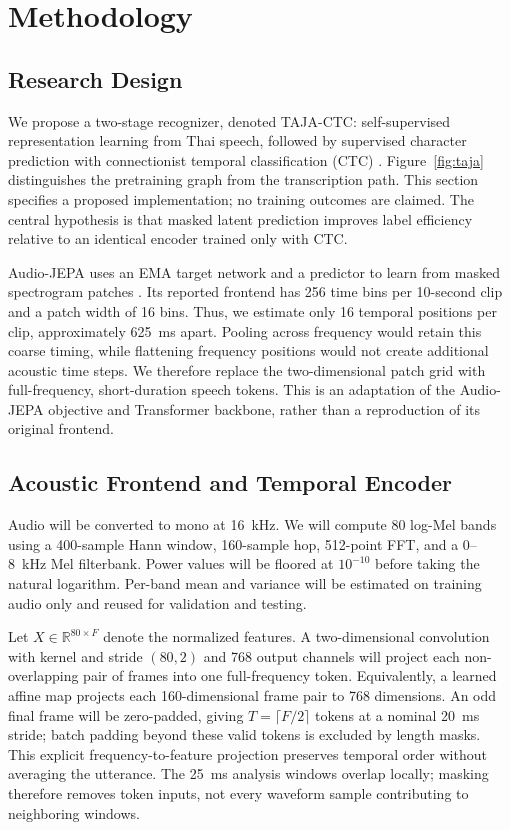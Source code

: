\section{Methodology}
\label{sec:method}

\subsection{Research Design}
We propose a two-stage recognizer, denoted TAJA-CTC: self-supervised representation learning from Thai speech, followed by supervised character prediction with connectionist temporal classification (CTC) \cite{graves2006ctc}. Figure~\ref{fig:taja} distinguishes the pretraining graph from the transcription path. This section specifies a proposed implementation; no training outcomes are claimed. The central hypothesis is that masked latent prediction improves label efficiency relative to an identical encoder trained only with CTC.

Audio-JEPA uses an EMA target network and a predictor to learn from masked spectrogram patches \cite{tuncay2025audiojepa}. Its reported frontend has 256 time bins per 10-second clip and a patch width of 16 bins. Thus, we estimate only 16 temporal positions per clip, approximately 625~ms apart. Pooling across frequency would retain this coarse timing, while flattening frequency positions would not create additional acoustic time steps. We therefore replace the two-dimensional patch grid with full-frequency, short-duration speech tokens. This is an adaptation of the Audio-JEPA objective and Transformer backbone, rather than a reproduction of its original frontend.



\subsection{Acoustic Frontend and Temporal Encoder}
Audio will be converted to mono at 16~kHz. We will compute 80 log-Mel bands using a 400-sample Hann window, 160-sample hop, 512-point FFT, and a 0--8~kHz Mel filterbank. Power values will be floored at $10^{-10}$ before taking the natural logarithm. Per-band mean and variance will be estimated on training audio only and reused for validation and testing.

Let $X\in\mathbb{R}^{80\times F}$ denote the normalized features. A two-dimensional convolution with kernel and stride $(80,2)$ and 768 output channels will project each non-overlapping pair of frames into one full-frequency token. Equivalently, a learned affine map projects each 160-dimensional frame pair to 768 dimensions. An odd final frame will be zero-padded, giving $T=\lceil F/2\rceil$ tokens at a nominal 20~ms stride; batch padding beyond these valid tokens is excluded by length masks. This explicit frequency-to-feature projection preserves temporal order without averaging the utterance. The 25~ms analysis windows overlap locally; masking therefore removes token inputs, not every waveform sample contributing to neighboring windows.

